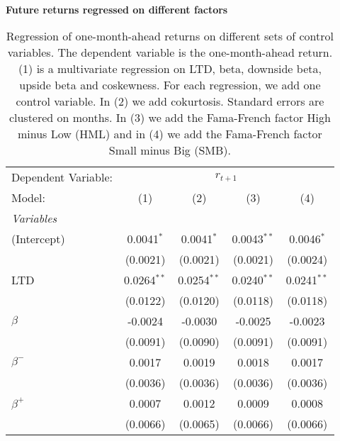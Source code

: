 \begin{table}[H]
\caption{\\ \large{\textbf{Future returns regressed on different factors}}}
\captionsetup{justification = justified, width = \linewidth}
\caption*{Regression of one-month-ahead returns on different
                               sets of control variables. The dependent variable is
                               the one-month-ahead return. (1) is a multivariate 
                               regression on LTD, beta, downside beta, upside beta and coskewness. For each regression, we
                               add one control variable. In (2) we add cokurtosis. 
                               Standard errors are clustered on months. In (3) we add the Fama-French
                               factor High minus Low (HML) and in (4) we add the Fama-French factor
                               Small minus Big (SMB).}
   \centering
\label{reg_clustered_on_time_2}
   \begin{tabular}{lcccc}
      \tabularnewline \midrule \midrule
      Dependent Variable: & \multicolumn{4}{c}{$r_{t+1}$}\\
      Model:         & (1)           & (2)           & (3)           & (4)\\  
      \midrule
      \emph{Variables}\\
      (Intercept)    & 0.0041$^{*}$  & 0.0041$^{*}$  & 0.0043$^{**}$ & 0.0046$^{*}$\\   
                     & (0.0021)      & (0.0021)      & (0.0021)      & (0.0024)\\   
      LTD            & 0.0264$^{**}$ & 0.0254$^{**}$ & 0.0240$^{**}$ & 0.0241$^{**}$\\   
                     & (0.0122)      & (0.0120)      & (0.0118)      & (0.0118)\\   
      $\beta$        & -0.0024       & -0.0030       & -0.0025       & -0.0023\\   
                     & (0.0091)      & (0.0090)      & (0.0091)      & (0.0091)\\   
      $\beta^{-}$    & 0.0017        & 0.0019        & 0.0018        & 0.0017\\   
                     & (0.0036)      & (0.0036)      & (0.0036)      & (0.0036)\\   
      $\beta^{+}$    & 0.0007        & 0.0012        & 0.0009        & 0.0008\\   
                     & (0.0066)      & (0.0065)      & (0.0066)      & (0.0066)\\   

\end{tabular}
\end{table}
